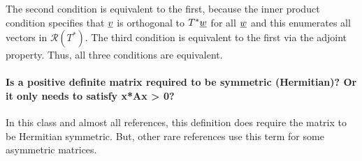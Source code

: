 \documentclass[10pt,english]{article}
\begin{document}
The second condition is equivalent to the first, because the inner product condition specifies that $\underline{v}$ is orthogonal to $T^* \underline{w}$ for all $\underline{w}$ and this enumerates all vectors in $\mathcal{R}(T^*)$.
The third condition is equivalent to the first via the adjoint property.
Thus, all three conditions are equivalent.



\paragraph{Is a positive definite matrix required to be symmetric (Hermitian)? Or it only needs to satisfy x*Ax > 0?}

In this class and almost all references, this definition does require the matrix to be Hermitian symmetric.
But, other rare references use this term for some asymmetric matrices.
\end{document}

